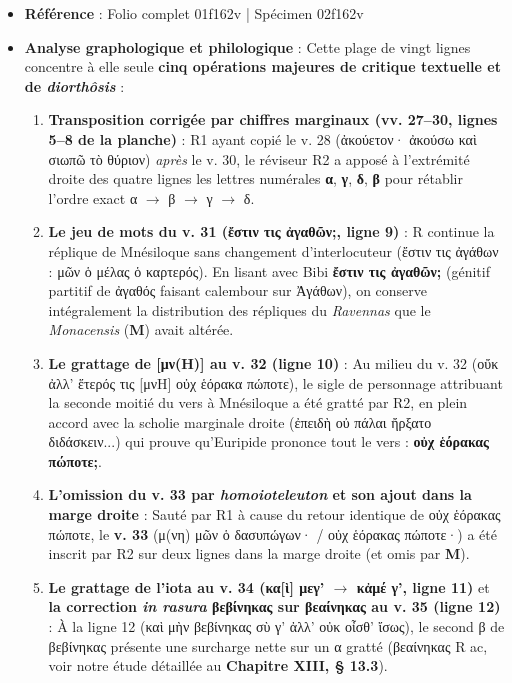 \documentclass[11pt, a4paper, twoside]{article}
\renewcommand{\_}{\origunderscore\penalty0\relax}
\renewcommand{\texttt}[1]{#1}
\newcommand{\R}{\textbf{R}}
\newcommand{\Run}{\textbf{R}\textsuperscript{1}}
\newcommand{\Rac}{\textbf{R}\textsuperscript{ac}}
\newcommand{\Rdeux}{\textbf{R}\textsuperscript{2}}
\newcommand{\M}{\textbf{M}}
\newcommand{\Bibi}{\textit{Bibi}}
\newcommand{\inRas}[2]{[\kern-0.15em[#1]\kern-0.15em]#2}
\newcommand{\auDessus}[2]{\ensuremath{\overset{\text{#2}}{\text{#1}}}}
\def\R{R}%
\def\Run{R1}%
\def\Rac{R ac}%
\def\Rdeux{R2}%
\def\Bibi{Bibi}%
\def\inRas#1#2{[#1]#2}%
\def\auDessus#1#2{#1(#2)}%
\begin{document}
\begin{itemize}[leftmargin=1.5em, itemsep=2pt]
  \item \textbf{Référence} : Folio complet \texttt{01\_f162v} | Spécimen \texttt{02\_f162v}
  \item \textbf{Analyse graphologique et philologique} :
  Cette plage de vingt lignes concentre à elle seule \textbf{cinq opérations majeures de critique textuelle et de \textit{diorthôsis}} :
  \begin{enumerate}[leftmargin=1.6em, itemsep=2pt]
  \item \textbf{Transposition corrigée par chiffres marginaux (\texttt{vv. 27–30}, lignes 5–8 de la planche)} : \Run{} ayant copié le v. 28 (\texttt{ἀκούετον· ἀκούσω καὶ σιωπῶ τὸ θύριον}) \textit{après} le v. 30, le réviseur \Rdeux{} a apposé à l'extrémité droite des quatre lignes les lettres numérales \textbf{\texttt{α}}, \textbf{\texttt{γ}}, \textbf{\texttt{δ}}, \textbf{\texttt{β}} pour rétablir l'ordre exact α $\to$ β $\to$ γ $\to$ δ.
  \item \textbf{Le jeu de mots du v. 31 (\texttt{ἔστιν τις ἀγαθῶν;}, ligne 9)} : \R{} continue la réplique de Mnésiloque sans changement d'interlocuteur (\texttt{ἔστιν τις ἀγάθων : μῶν ὁ μέλας ὁ καρτερός}). En lisant avec \Bibi{} \textbf{\texttt{ἔστιν τις ἀγαθῶν;}} (génitif partitif de ἀγαθός faisant calembour sur Ἀγάθων), on conserve intégralement la distribution des répliques du \textit{Ravennas} que le \textit{Monacensis} (\M{}) avait altérée.
  \item \textbf{Le grattage de \texttt{\inRas{μ\auDessus{ν}{Η}}{}} au v. 32 (ligne 10)} : Au milieu du v. 32 (\texttt{οὔκ ἀλλ' ἕτερός τις [μνΗ] οὐχ ἑόρακα πώποτε}), le sigle de personnage attribuant la seconde moitié du vers à Mnésiloque a été gratté par \Rdeux{}, en plein accord avec la scholie marginale droite (\texttt{ἐπειδὴ οὐ πάλαι ἤρξατο διδάσκειν...}) qui prouve qu'Euripide prononce tout le vers : \textbf{\texttt{οὐχ ἑόρακας πώποτε;}}.
  \item \textbf{L'omission du v. 33 par \textit{homoioteleuton} et son ajout dans la marge droite} : Sauté par \Run{} à cause du retour identique de \texttt{οὐχ ἑόρακας πώποτε}, le \textbf{v. 33} (\texttt{μ(νη) μῶν ὁ δασυπώγων· / οὐχ ἑόρακας πώποτε·}) a été inscrit par \Rdeux{} sur deux lignes dans la marge droite (et omis par \M{}).
  \item \textbf{Le grattage de l'iota au v. 34 (\texttt{κα[ὶ] μεγ'} $\to$ \texttt{κἀμέ γ'}, ligne 11)} et \textbf{la correction \textit{in rasura} \texttt{βεβίνηκας} sur \texttt{βεαίνηκας} au v. 35 (ligne 12)} : À la ligne 12 (\texttt{καὶ μὴν βεβίνηκας σὺ γ' ἀλλ' οὐκ οἶσθ' ἴσως}), le second β de \texttt{βεβίνηκας} présente une surcharge nette sur un α gratté (\texttt{βεαίνηκας} \Rac{}, voir notre étude détaillée au \textbf{Chapitre XIII, § 13.3}).
  \end{enumerate}
\end{itemize}
\end{document}
